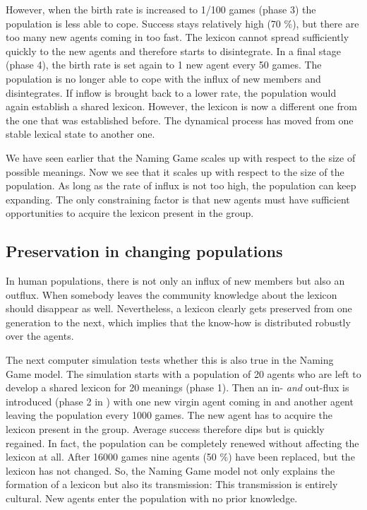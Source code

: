 However, when the birth rate is increased
to 1/100 games (phase 3) the population is less able to cope. 
Success stays relatively high (70 \%), but there are too many 
new agents coming in too fast. The lexicon cannot spread 
sufficiently quickly to the new agents and therefore starts 
to disintegrate. In a final stage (phase 4), the birth rate 
is set again to 1 new agent every 50 games. The population is no longer  
able to cope with the influx of new members and disintegrates. 
If inflow is brought back to a lower rate, the population would 
again establish a shared lexicon. However, 
the lexicon is now a different one
from the one that was established before. 
The dynamical process
has moved from one stable lexical state to another one.  

We have seen earlier that the Naming Game scales
up with respect to the size of possible meanings. Now 
we see that it scales up with respect to the size of 
the population. As long as the rate of influx is not too
high, the population can keep expanding. 
The only constraining factor is that new agents
must have sufficient opportunities to acquire the lexicon
present in the group. 

\subsection{Preservation in changing populations}

In human populations, there is not only an influx of 
new members but also an outflux. When somebody leaves
the community knowledge about the lexicon should
disappear as well. Nevertheless, a lexicon clearly 
gets preserved from one generation to the next, which 
implies that the know-how is distributed robustly over
the agents.

The next computer simulation tests whether this is also true
in the Naming Game model. 
The simulation starts with a population of 20 agents who 
are left to develop a shared lexicon for 
20 meanings (phase 1). 
Then an in- {\itshape and} out-flux is introduced (phase 2 in 
) with one
new virgin agent coming in 
and another agent leaving the population every 1000 games. 
The new agent has to acquire the lexicon present in the group. 
Average success therefore dips but is quickly regained.
In fact, the population can be completely renewed without affecting the
lexicon at all. 
After 16000 games nine agents (50 \%) have been
replaced, but the lexicon has not changed. So, the Naming Game model
not only explains the formation of 
a lexicon but also its transmission: This transmission is 
entirely cultural. New agents enter the population with no 
prior knowledge. 

